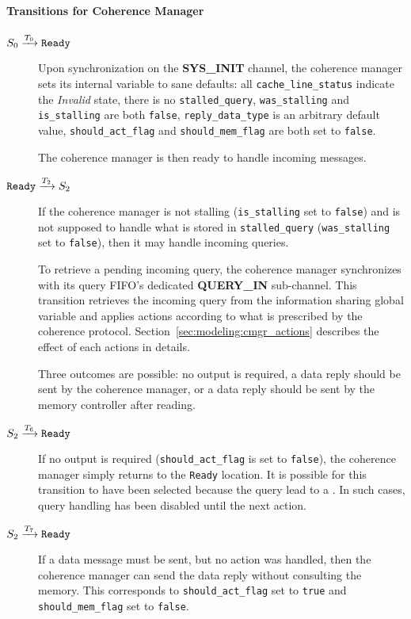 \paragraph{Transitions for Coherence Manager}
\begin{description}
\item[$S_0 \xrightarrow[]{T_{0}} \texttt{Ready}$]
   Upon synchronization on the \textbf{SYS\_INIT} channel, the coherence manager
   sets its internal variable to sane defaults: all
   \lstinline!cache_line_status! indicate the \textit{Invalid} state, there is
   no \lstinline!stalled_query!, \lstinline!was_stalling! and
   \lstinline!is_stalling! are both \lstinline!false!,
   \lstinline!reply_data_type! is an arbitrary default value,
   \lstinline!should_act_flag! and \lstinline!should_mem_flag! are both set to
   \lstinline!false!.

   The coherence manager is then ready to handle incoming messages.

\item[$\texttt{Ready} \xrightarrow[]{T_{2}} S_2$]
   If the coherence manager is not stalling (\lstinline!is_stalling! set
   to \lstinline!false!) and is not supposed to handle what is stored in
   \lstinline!stalled_query! (\lstinline!was_stalling! set to
   \lstinline!false!), then it may handle incoming queries.

   To retrieve a pending incoming query, the coherence manager synchronizes with
   its query FIFO's dedicated \textbf{QUERY\_IN} sub-channel. This transition
   retrieves the incoming query from the information sharing global variable and
   applies actions according to what is prescribed by the coherence protocol.
   Section~\ref{sec:modeling:cmgr_actions} describes the effect of each actions
   in details.

   Three outcomes are possible: no output is required, a data reply should be
   sent by the coherence manager, or a data reply should be sent by the memory
   controller after reading.

\item[$S_2 \xrightarrow[]{T_{6}} \texttt{Ready}$]
   If no output is required (\lstinline!should_act_flag! is set to
   \lstinline!false!), the coherence manager simply returns to the
   \texttt{Ready} location. It is possible for this transition to have been
   selected because the query lead to a \stallact{}. In such cases, query
   handling has been disabled until the next \resumeact{} action.

\item[$S_2 \xrightarrow[]{T_{7}} \texttt{Ready}$]
   If a data message must be sent, but no \readact{} action was handled, then
   the coherence manager can send the data reply without consulting the memory.
   This corresponds to \lstinline!should_act_flag! set to \lstinline!true! and
   \lstinline!should_mem_flag! set to \lstinline!false!.


\end{description}
